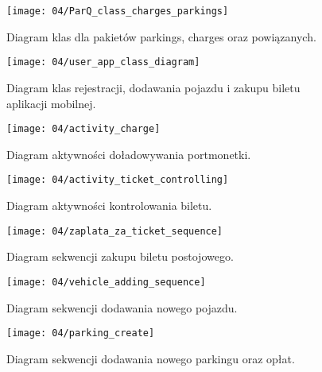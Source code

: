 \begin{figure}[p]
	\begin{center}
		\texttt{[image: 04/ParQ\_class\_charges\_parkings]}
	\end{center}
	\caption{Diagram klas dla pakietów parkings, charges oraz powiązanych.}
\end{figure}

\begin{figure}[p]
	\begin{center}
		\texttt{[image: 04/user\_app\_class\_diagram]}
	\end{center}
	\caption{Diagram klas rejestracji, dodawania pojazdu i zakupu biletu aplikacji mobilnej.}
\end{figure}

\begin{figure}[p]
	\begin{center}
		\texttt{[image: 04/activity\_charge]}
	\end{center}
	\caption{Diagram aktywności doładowywania portmonetki.}
\end{figure}

\begin{figure}[p]
	\begin{center}
		\texttt{[image: 04/activity\_ticket\_controlling]}
	\end{center}
	\caption{Diagram aktywności kontrolowania biletu.}
\end{figure}

\begin{figure}[p]
	\begin{center}
		\texttt{[image: 04/zaplata\_za\_ticket\_sequence]}
	\end{center}
	\caption{Diagram sekwencji zakupu biletu postojowego.}
\end{figure}

\begin{figure}[p]
	\begin{center}
		\texttt{[image: 04/vehicle\_adding\_sequence]}
	\end{center}
	\caption{Diagram sekwencji dodawania nowego pojazdu.}
\end{figure}

\begin{figure}[p]
	\begin{center}
		\texttt{[image: 04/parking\_create]}
	\end{center}
	\caption{Diagram sekwencji dodawania nowego parkingu oraz opłat.}
\end{figure}

